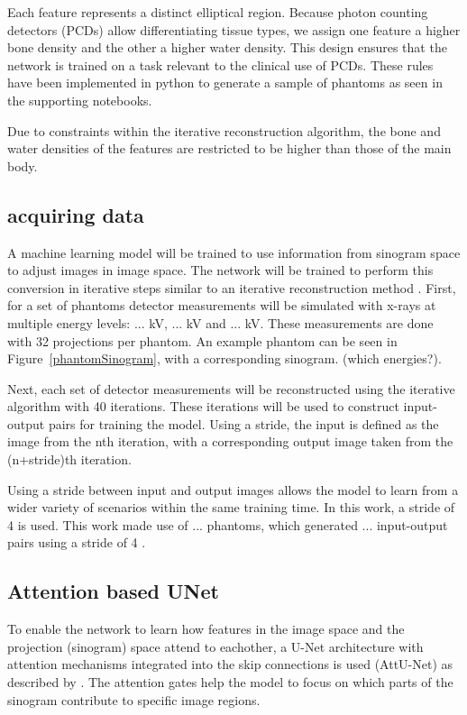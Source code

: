 \documentclass{article}
\begin{document}
Each feature represents a distinct elliptical region. Because photon counting detectors (PCDs) allow differentiating tissue types, we assign one feature a higher bone density and the other a higher water density. This design ensures that the network is trained on a task relevant to the clinical use of PCDs. These rules have been implemented in python to generate a sample of phantoms as seen in the supporting notebooks.

Due to constraints within the iterative reconstruction algorithm, the bone and water densities of the features are restricted to be higher than those of the main body.

\subsection{acquiring data}

A machine learning model will be trained to use information from sinogram space to adjust images in image space. The network will be trained to perform this conversion in iterative steps similar to an iterative reconstruction method \citep{mechlem2018joint}.
First, for a set of phantoms detector measurements will be simulated with x-rays at multiple energy levels: ... kV, ... kV and ... kV. These measurements are done with 32 projections per phantom. An example phantom can be seen in Figure~\ref{phantomSinogram}, with a corresponding sinogram. (which energies?).

Next, each set of detector measurements will be reconstructed using the iterative algorithm with 40 iterations. These iterations will be used to construct input-output pairs for training the model. Using a stride, the input is defined as the image from the nth iteration, with a corresponding output image taken from the (n+stride)th iteration.

Using a stride between input and output images allows the model to learn from a wider variety of scenarios within the same training time. In this work, a stride of 4 is used. This work made use of ... phantoms, which generated ... input-output pairs using a stride of 4 .

\subsection{Attention based UNet}

To enable the network to learn how features in the image space and the projection (sinogram) space attend to eachother, a U-Net architecture with attention mechanisms integrated into the skip connections is used (AttU-Net) as described by \citep{oktay2018attentionunet}. The attention gates help the model to focus on which parts of the sinogram contribute to specific image regions.
\end{document}
